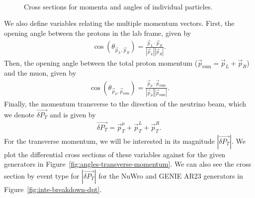 \documentclass{article}
\newcommand{\vm}{\vec{p}_\mu}
\newcommand{\vlp}{\vec{p}_L}
\newcommand{\vrp}{\vec{p}_R}
\newcommand{\vtp}{\vec{p}_{\text{sum}}}
\newcommand{\vdp}{\vec{\delta P_T}}
\begin{document}
\begin{figure}
     \\
    \caption{Cross sections for momenta and angles of individual particles.}
    \label{fig:momenta-cos-theta}
\end{figure}

\afterpage{\clearpage}

We also define variables relating the multiple momentum vectors. First, the opening angle between the protons in the lab frame, given by 
\begin{align}
    \cos\left(\theta_{\vlp,\vrp}\right) = \frac{\vlp \cdot \vrp}{|\vlp||\vrp|}.
\end{align}
Then, the opening angle between the total proton momentum ($\vtp = \vlp + \vrp$) and the muon, given by 
\begin{align}
    \cos\left(\theta_{\vm,\vtp}\right) = \frac{\vm \cdot \vtp}{|\vm||\vtp|}.
\end{align}
Finally, the momentum transverse to the direction of the neutrino beam, which we denote $\vdp$ and is given by 
\begin{align}
    \vdp = \vec{p}^{\mu}_T + \vec{p}^{L}_T + \vec{p}^{R}_T.
\end{align}
For the transverse momentum, we will be interested in its magnitude $|\vdp|$. We plot the differential cross sections of these variables against for the given generators in Figure~\ref{fig:angles-transverse-momentum}. We can also see the cross section by event type for $|\vdp|$ for the NuWro and GENIE AR23 generators in Figure~\ref{fig:inte-breakdown-dpt}.
\end{document}
